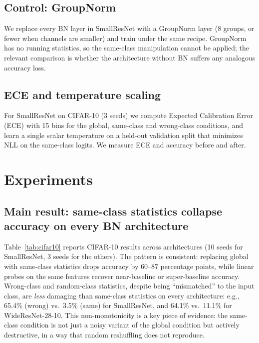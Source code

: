 \documentclass[11pt]{article}
\begin{document}
\subsection{Control: GroupNorm}
We replace every BN layer in SmallResNet with a GroupNorm layer (8 groups, or fewer when channels are smaller) and train under the same recipe. GroupNorm has no running statistics, so the same-class manipulation cannot be applied; the relevant comparison is whether the architecture without BN suffers any analogous accuracy loss.

\subsection{ECE and temperature scaling}
For SmallResNet on CIFAR-10 (3 seeds) we compute Expected Calibration Error (ECE) with 15 bins for the global, same-class and wrong-class conditions, and learn a single scalar temperature on a held-out validation split that minimizes NLL on the same-class logits. We measure ECE and accuracy before and after.

\section{Experiments}

\subsection{Main result: same-class statistics collapse accuracy on every BN architecture}
Table~\ref{tab:cifar10} reports CIFAR-10 results across architectures (10 seeds for SmallResNet, 3 seeds for the others). The pattern is consistent: replacing global with same-class statistics drops accuracy by 60--87 percentage points, while linear probes on the same features recover near-baseline or super-baseline accuracy. Wrong-class and random-class statistics, despite being ``mismatched'' to the input class, are \emph{less} damaging than same-class statistics on every architecture: e.g., 65.4\% (wrong) vs.\ 3.5\% (same) for SmallResNet, and 64.1\% vs.\ 11.1\% for WideResNet-28-10. This non-monotonicity is a key piece of evidence: the same-class condition is not just a noisy variant of the global condition but actively destructive, in a way that random reshuffling does not reproduce.
\end{document}
